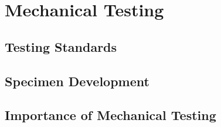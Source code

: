 \section{Mechanical Testing\label{sec:literatureReview:testing}}

\subsection{Testing Standards\label{sec:literatureReview:testing:standards}}

\subsection{Specimen Development\label{sec:literatureReview:testing:specimens}}

\subsection{Importance of Mechanical Testing\label{sec:literatureReview:testing:importance}}
